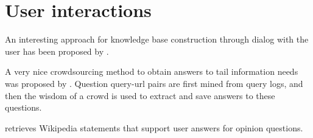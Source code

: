 \section{User interactions}

An interesting approach for knowledge base construction through dialog with the user has been proposed by \cite{hixon2015learning}.

A very nice crowdsourcing method to obtain answers to tail information needs was proposed by \cite{bernstein2012direct}.
Question query-url pairs are first mined from query logs, and then the wisdom of a crowd is used to extract and save answers to these questions.

\cite{braunstain2016supporting} retrieves Wikipedia statements that support user answers for opinion questions.


\clearpage